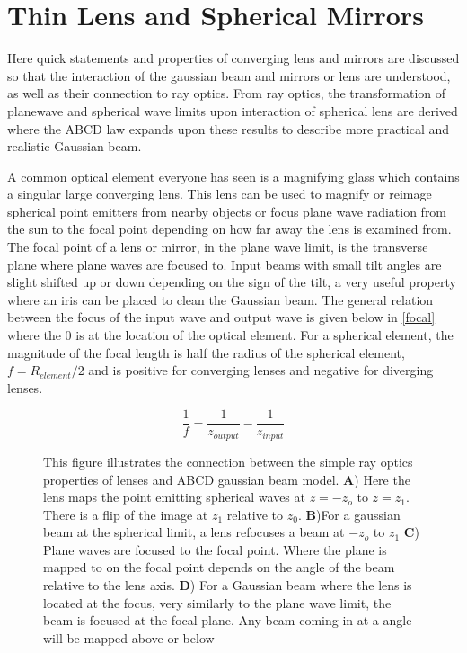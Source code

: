 \documentclass[11pt,a4paper]{book}
\newcommand{\imginput}[1]{} %
\begin{document}
	\section{Thin Lens and Spherical Mirrors}
		\label{sec:Thin Lens and Spherical Mirrors}
		Here quick statements and properties of converging lens and mirrors are discussed so that the interaction of the gaussian beam and mirrors or lens are understood, as well as their connection to ray optics. From ray optics, the transformation of planewave and spherical wave limits upon interaction of spherical lens are derived where the ABCD law expands upon these results to describe more practical and realistic Gaussian beam.
		
		A common optical element everyone has seen is a magnifying glass which contains a singular large converging lens. 
		This lens can be used to magnify or reimage spherical point emitters from nearby objects or focus plane wave radiation from the sun to the focal point depending on how far away the lens is examined from.
		The focal point of a lens or mirror, in the plane wave limit, is the transverse plane where plane waves are focused to. 
		Input beams with small tilt angles are slight shifted up or down depending on the sign of the tilt, a very useful property where an iris can be placed to clean the Gaussian beam. 
		The general relation between the focus of the input wave and output wave is given below in \autoref{focal} where the 0 is at the location of the optical element. 
		For a spherical element, the magnitude of the focal length is half the radius of the spherical element, $f=R_{element}/2$ and is positive for converging lenses and negative for diverging lenses.
		
		\begin{equation}\label{focal}
			\frac{1}{f}=\frac{1}{z_{output}}-\frac{1}{z_{input}}
		\end{equation}

		\begin{figure} [!ht]
			\centering
			\def\svgwidth{\columnwidth}
			\resizebox{150mm}{!}{\imginput{images/lens-reimage-focus.pdf_tex}}
			\caption{
				This figure illustrates the connection between the simple ray optics properties of lenses and ABCD gaussian beam model.
				\newline 
				\textbf{A}) Here the lens maps the point emitting spherical waves at $z=-z_o$ to $z=z_1$. There is a flip of the image at $z_1$ relative to $z_0$.
				\newline
				\textbf{B})For a gaussian beam at the spherical limit, a lens refocuses a beam at $-z_o$ to $z_1$
				\newline
				\textbf{C}) Plane waves are focused to the focal point. Where the plane is mapped to on the focal point depends on the angle of the beam relative to the lens axis.
				\newline
				\textbf{D}) For a Gaussian beam where the lens is located at the focus, very similarly to the plane wave limit, the beam is focused at the focal plane. Any beam coming in at a angle will be mapped above or below}
			\label{fig:lens-reimage-focus}
		\end{figure}
		
\end{document}
